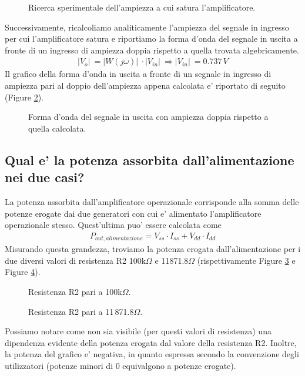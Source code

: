 \documentclass[a4paper,10pt]{article}
\begin{document}
\begin{figure}[h!]
	\centering
  	\caption{Ricerca sperimentale dell'ampiezza a cui satura l'amplificatore.}
  	\label{fig:plotsatr2}
\end{figure}

Successivamente, ricalcoliamo analiticamente l'ampiezza del segnale in ingresso per cui l'amplificatore satura e riportiamo la forma d'onda del segnale in uscita a fronte di un ingresso di ampiezza doppia rispetto a quella trovata algebricamente.
\begin{align*}
\lvert V_o \rvert\ = \lvert W(j\omega) \rvert\ \cdot \lvert V_{in} \rvert\ \Rightarrow \lvert V_{in} \rvert\ = 0.737\,V
\end{align*}
Il grafico della forma d'onda in uscita a fronte di un segnale in ingresso di ampiezza pari al doppio dell'ampiezza appena calcolata e' riportato di seguito (Figure \ref{fig:plottaglior2}).
\begin{figure}[h!]
	\centering
  	\caption{Forma d'onda del segnale in uscita con ampiezza doppia rispetto a quella calcolata.}
  	\label{fig:plottaglior2}
\end{figure}

\newpage

\subsection{Qual e' la potenza assorbita dall'alimentazione nei due casi?}
La potenza assorbita dall'amplificatore operazionale corrisponde alla somma delle potenze erogate dai due generatori con cui e' alimentato l'amplificatore operazionale stesso. Quest'ultima puo' essere calcolata come
\begin{align*}
P_{out, alimentazione} = V_{ss} \cdot I_{ss} + V_{dd} \cdot I_{dd}
\end{align*}
Misurando questa grandezza, troviamo la potenza erogata dall'alimentazione per i due diversi valori di resistenza R2 100k$\Omega$ e 11871.8$\Omega$ (rispettivamente Figure \ref{fig:pow1} e Figure \ref{fig:pow2}).

\begin{figure}[h!]
	\centering
  	\caption{Resistenza R2 pari a 100k$\Omega$.}
  	\label{fig:pow1}
\end{figure}

\begin{figure}[h!]
	\centering
  	\caption{Resistenza R2 pari a 11\,871.8$\Omega$.}
  	\label{fig:pow2}
\end{figure}

Possiamo notare come non sia visibile (per questi valori di resistenza) una dipendenza evidente della potenza erogata dal valore della resistenza R2. Inoltre, la potenza del grafico e' negativa, in quanto espressa secondo la convenzione degli utilizzatori (potenze minori di 0 equivalgono a potenze erogate).
\end{document}
